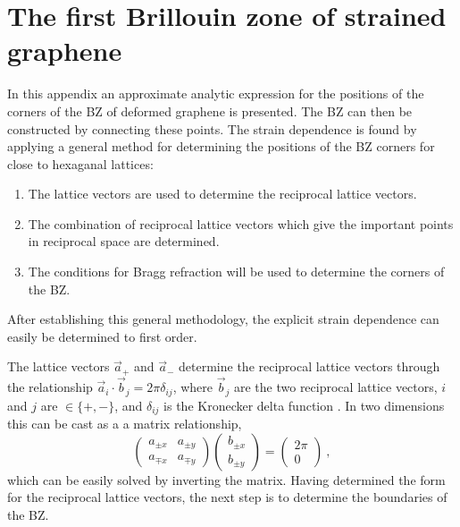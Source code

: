 \chapter{The first Brillouin zone of strained graphene \label{chap:sBZ}}

In this appendix an approximate analytic expression for the positions of the corners of the BZ of deformed graphene is presented.
The BZ can then be constructed by connecting these points.
The strain dependence is found by applying a general method for determining the positions of the BZ corners for close to hexaganal lattices:
\begin{enumerate}
	\item{The lattice vectors are used to determine the reciprocal lattice vectors.}
	\item{The combination of reciprocal lattice vectors which give the important points in reciprocal space are determined.}
	\item{The conditions for Bragg refraction will be used to determine the corners of the BZ.}
\end{enumerate}
After establishing this general methodology, the explicit strain dependence can easily be determined to first order.

The lattice vectors $\vec{a}_+$ and $\vec{a}_-$ determine the reciprocal lattice vectors through the relationship $\vec{a}_i \cdot \vec{b}_j=2 \pi \delta_{ij}$, where $\vec{b}_j$ are the two reciprocal lattice vectors, $i$ and $j$ are $\in \{+,-\}$, and $\delta_{ij}$ is the Kronecker delta function \cite{Kittel2005}.
In two dimensions this can be cast as a a matrix relationship,
\begin{equation}
	\left(\begin{array}{cc}
		a_{\pm x} & a_{\pm y} \\
		a_{\mp x} & a_{\mp y} \end{array} \right)
	\left(\begin{array}{c} 
		b_{\pm x} \\
		b_{\pm y} \end{array} \right) 
	=
	\left(\begin{array}{c} 2 \pi \\ 0 \end{array} \right) \ ,
	\label{eq:sBZ:RLVs}
\end{equation}
which can be easily solved by inverting the matrix.
Having determined the form for the reciprocal lattice vectors, the next step is to determine the boundaries of the BZ.

